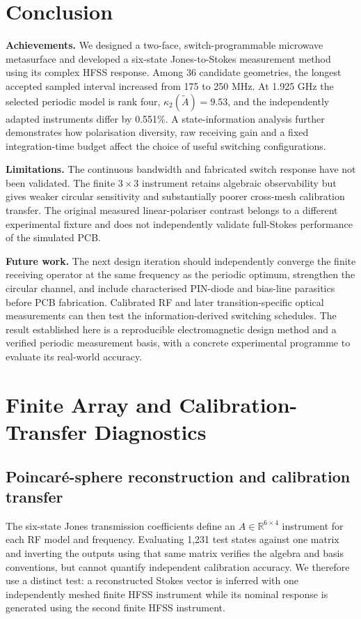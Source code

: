 \documentclass{ieeeaccess}
\begin{document}
\section{Conclusion}
\noindent\textbf{Achievements.} We designed a two-face, switch-programmable microwave metasurface and developed a six-state Jones-to-Stokes measurement method using its complex HFSS response. Among 36 candidate geometries, the longest accepted sampled interval increased from 175 to 250 MHz. At 1.925 GHz the selected periodic model is rank four, $\kappa_2(\widetilde A)=9.53$, and the independently adapted instruments differ by 0.551\%. A state-information analysis further demonstrates how polarisation diversity, raw receiving gain and a fixed integration-time budget affect the choice of useful switching configurations.

\noindent\textbf{Limitations.} The continuous bandwidth and fabricated switch response have not been validated. The finite $3\times3$ instrument retains algebraic observability but gives weaker circular sensitivity and substantially poorer cross-mesh calibration transfer. The original measured linear-polariser contrast belongs to a different experimental fixture and does not independently validate full-Stokes performance of the simulated PCB.

\noindent\textbf{Future work.} The next design iteration should independently converge the finite receiving operator at the same frequency as the periodic optimum, strengthen the circular channel, and include characterised PIN-diode and bias-line parasitics before PCB fabrication. Calibrated RF and later transition-specific optical measurements can then test the information-derived switching schedules. The result established here is a reproducible electromagnetic design method and a verified periodic measurement basis, with a concrete experimental programme to evaluate its real-world accuracy.



\appendix
\section{Finite Array and Calibration-Transfer Diagnostics}\label{app:finite}
\subsection{Poincar\'e-sphere reconstruction and calibration transfer}
The six-state Jones transmission coefficients define an $A\in\mathbb R^{6\times4}$ instrument for each RF model and frequency. Evaluating 1,231 test states against one matrix and inverting the outputs using that same matrix verifies the algebra and basis conventions, but cannot quantify independent calibration accuracy. We therefore use a distinct test: a reconstructed Stokes vector is inferred with one independently meshed finite HFSS instrument while its nominal response is generated using the second finite HFSS instrument.
\end{document}
